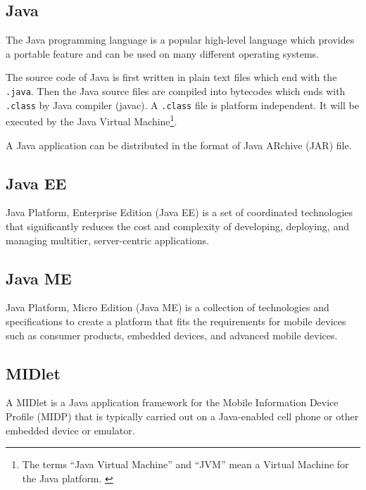 
\subsection*{Java}
\label{sec:Java}

The Java\texttrademark{} programming language is a popular high-level language which provides a portable feature and can be used on many different operating systems. 

The source code of Java is first written in plain text files which end with the \nolinebreak\texttt{.java}. Then the Java source files are compiled into bytecodes which ends with \nolinebreak\texttt{.class} by Java compiler (javac). A \nolinebreak\texttt{.class} file is platform independent. It will be executed by the Java Virtual Machine\label{sym:JVM}\footnote{The terms ``Java Virtual Machine'' and ``JVM'' mean a Virtual Machine for the Java platform. \cite{TheJavaProgrammingLanguage}}. \cite{TheJavaProgrammingLanguage}

A Java application can be distributed in the format of Java ARchive (JAR\label{sym:JAR}) file.

\subsection*{Java EE}
\label{sec:JavaEE}
\label{sym:JavaEE}

Java Platform, Enterprise Edition (Java EE) is a set of coordinated technologies that significantly reduces the cost and complexity of developing, deploying, and managing multitier, server-centric applications. \cite{JavaEETechnology}


\subsection*{Java ME}
\label{sec:JavaME}
\label{sym:JavaME}

Java Platform, Micro Edition (Java ME) is a collection of technologies and specifications to create a platform that fits the requirements for mobile devices such as consumer products, embedded devices, and advanced mobile devices. \cite{JavaMETechnology}

\subsection*{MIDlet}
\label{sec:MIDlet}
\label{sym:MIDlet}

A MIDlet is a Java application framework for the Mobile Information Device Profile (MIDP\label{sym:MIDP}) that is typically carried out on a Java-enabled cell phone or other embedded device or emulator.

